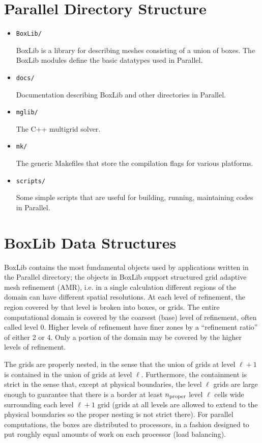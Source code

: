 \section{Parallel Directory Structure}

\begin{itemize}
\item {\tt BoxLib/} 

 BoxLib is a library for describing meshes consisting of a union
 of boxes.  The BoxLib modules define the basic datatypes used
 in Parallel.

\item {\tt docs/}

 Documentation describing BoxLib and other directories in Parallel.

\item {\tt mglib/}

  The C++ multigrid solver.

\item {\tt mk/}

  The generic Makefiles that store the compilation flags for
  various platforms.

\item {\tt scripts/}

  Some simple scripts that are useful for building, running,
  maintaining codes in Parallel.

\end{itemize}

\section{BoxLib Data Structures}

BoxLib contains the most fundamental objects used by applications written
in the Parallel directory; the objects in BoxLib support structured
grid adaptive mesh refinement (AMR), i.e. in a single calculation
different regions of the domain can have different spatial resolutions.  
At each level of refinement, the region covered by that level is broken
into boxes, or grids.  The entire computational domain is covered by
the coarsest (base) level of refinement, often called level 0. 
Higher levels of refinement have finer zones by a ``refinement ratio''
of either 2 or 4.  Only a portion of the domain may
be covered by the higher levels of refinement.  

The grids are properly nested, in the sense that the union of grids
at level $\ell+1$ is contained in the union of grids at level $\ell$.
Furthermore, the containment is strict in the sense that,
except at physical boundaries,
the level $\ell$ grids are large enough to guarantee that there is
a border at least $n_{\rm proper}$ level $\ell$ cells wide surrounding each level
$\ell +1$ grid (grids at all levels are allowed to extend to the physical
boundaries so the proper nesting is not strict there).
For parallel computations, the boxes are distributed to processors, in
a fashion designed to put roughly equal amounts of work on each
processor (load balancing).

